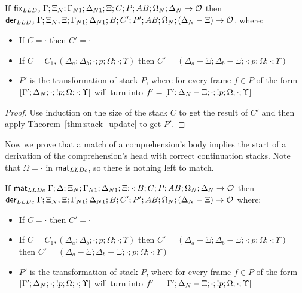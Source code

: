 \begin{theorem}\label{thm:from_update_to_derivation}
If $\mathsf{fix}_{LLDc} \; \Gamma; \Xi_N; \Gamma_{N1}; \Delta_{N1}; \Xi; C; P; AB; \Omega_N;
\Delta_N \rightarrow \mathcal{O}$ then\\
\texttab$\mathsf{der}_{LLDc} \; \Gamma; \Xi_N, \Xi;
\Gamma_{N1}; \Delta_{N1}; B; C' ; P'; AB; \Omega_N; (\Delta_N - \Xi) \rightarrow
\mathcal{O}$, where:

\begin{itemize}[leftmargin=*]
   \item If $C = \cdot$ then $C' = \cdot$

   \item If $C = C_1, (\Delta_a; \Delta_b; \cdot; p; \Omega; \cdot; \Upsilon)$
   then $C' = (\Delta_a - \Xi; \Delta_b - \Xi; \cdot; p; \Omega; \cdot;
         \Upsilon)$

   \item $P'$ is the transformation of stack $P$, where for every frame $f \in
   P$ of the form $[\Gamma'; \Delta_N; \cdot; {!} p; \Omega; \cdot; \Upsilon]$
   will turn into $f' = [\Gamma';\Delta_N-\Xi;\cdot;{!} p;\Omega;\cdot;\Upsilon]$

\end{itemize}
\end{theorem}
\begin{proof}
Use induction on the size of the stack $C$ to get the result of $C'$ and then
apply Theorem~\ref{thm:stack_update} to get $P'$.
\end{proof}


Now we prove that a match of a comprehension's body implies the start of a
derivation of the comprehension's head with correct continuation stacks. Note
that $\Omega = \cdot$ in $\mathsf{mat}_{LLDc}$, so there is nothing left to match.

\begin{corollary}\label{thm:match_to_derivation}
If $\mathsf{mat}_{LLDc} \; \Gamma; \Delta; \Xi_N; \Gamma_{N1}; \Delta_{N1}; \Xi; \cdot; B; C; P;
AB;\Omega_N; \Delta_N \rightarrow \mathcal{O}$ then\\
\texttab$\mathsf{der}_{LLDc} \; \Gamma; \Xi_N, \Xi; \Gamma_{N1}; \Delta_{N1}; B; C'; P'; AB; \Omega_N; (\Delta_N - \Xi) \rightarrow \mathcal{O}$ where:
   
\begin{itemize}[leftmargin=*]
   \item If $C = \cdot$ then $C' = \cdot$
   \item If $C = C_1, (\Delta_a; \Delta_b; \cdot; p; \Omega; \cdot; \Upsilon)$ then $C' = (\Delta_a - \Xi; \Delta_b - \Xi; \cdot; p; \Omega; \cdot; \Upsilon)$ then \linebreak $C' = (\Delta_a - \Xi; \Delta_b - \Xi; \cdot; p; \Omega; \cdot; \Upsilon)$
   \item $P'$ is the transformation of stack $P$, where for every frame $f \in
   P$ of the form $[\Gamma'; \Delta_N; \cdot; {!} p; \Omega; \cdot; \Upsilon]$
   will turn into $f' = [\Gamma';\Delta_N-\Xi;\cdot;{!} p;\Omega;\cdot;\Upsilon]$
\end{itemize}
\end{corollary}

